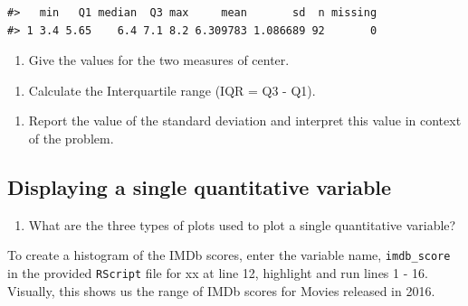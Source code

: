 \documentclass[
]{report}
\providecommand{\tightlist}{%
  \setlength{\itemsep}{0pt}\setlength{\parskip}{0pt}}
\begin{document}
\begin{verbatim}
#>   min   Q1 median  Q3 max     mean       sd  n missing
#> 1 3.4 5.65    6.4 7.1 8.2 6.309783 1.086689 92       0
\end{verbatim}

\begin{enumerate}
\def\labelenumi{\arabic{enumi}.}
\setcounter{enumi}{3}
\tightlist
\item
  Give the values for the two measures of center.
\end{enumerate}

\vspace{0.5in}

\begin{enumerate}
\def\labelenumi{\arabic{enumi}.}
\setcounter{enumi}{4}
\tightlist
\item
  Calculate the Interquartile range (IQR = Q3 - Q1).
\end{enumerate}

\vspace{0.5in}

\begin{enumerate}
\def\labelenumi{\arabic{enumi}.}
\setcounter{enumi}{5}
\tightlist
\item
  Report the value of the standard deviation and interpret this value in context of the problem.
  \vspace{1in}
\end{enumerate}

\hypertarget{displaying-a-single-quantitative-variable}{%
\subsection*{Displaying a single quantitative variable}\label{displaying-a-single-quantitative-variable}}

\begin{enumerate}
\def\labelenumi{\arabic{enumi}.}
\setcounter{enumi}{6}
\tightlist
\item
  What are the three types of plots used to plot a single quantitative variable?
\end{enumerate}

\newpage

To create a histogram of the IMDb scores, enter the variable name, \texttt{imdb\_score} in the provided \texttt{RScript} file for xx at line 12, highlight and run lines 1 - 16. Visually, this shows us the range of IMDb scores for Movies released in 2016.
\end{document}
